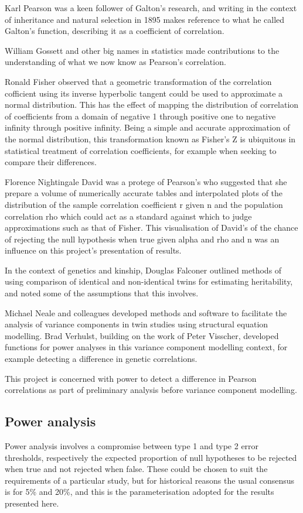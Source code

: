 Karl Pearson was a keen follower of Galton's research, and writing in the context of inheritance and natural selection in 1895 makes reference to what he called Galton's function, describing it as a coefficient of correlation.  

William Gossett and other big names in statistics made contributions to the understanding of what we now know as Pearson's correlation. 

Ronald Fisher observed that a geometric transformation of the correlation cofficient using its inverse hyperbolic tangent could be used to approximate a normal distribution.  This has the effect of mapping the distribution of correlation of coefficients from a domain of negative 1 through positive one to negative infinity through positive infinity. Being a simple and accurate approximation of the normal distribution, this transformation known as Fisher's Z is ubiquitous in statistical treatment of correlation coefficients, for example when seeking to compare their differences.

Florence Nightingale David was a protege of Pearson's who suggested that she prepare a volume of numerically accurate tables and interpolated plots of the distribution of the sample correlation coefficient r given n and the population correlation rho which could act as a standard against which to judge approximations such as that of Fisher.  This visualisation of David's of the chance of rejecting the null hypothesis when true given alpha and rho and n was an influence on this project's presentation of results.

In the context of genetics and kinship, Douglas Falconer outlined methods of using comparison of identical and non-identical twins for estimating heritability, and noted some of the assumptions that this involves.

Michael Neale and colleagues developed methods and software to facilitate the analysis of variance components in twin studies using structural equation modelling.  Brad Verhulst, building on the work of Peter Visscher, developed functions for power analyses in this variance component modelling context, for example detecting a difference in genetic correlations.

This project is concerned with power to detect a difference in Pearson correlations as part of preliminary analysis before variance component modelling.

\subsection{Power analysis}
Power analysis involves a compromise between type 1 and type 2 error thresholds, respectively the expected proportion of null hypotheses to be rejected when true and not rejected when false.  These could be chosen to suit the requirements of a particular study, but for historical reasons the usual consensus is for 5\% and 20\%, and this is the parameterisation adopted for the results presented here.

